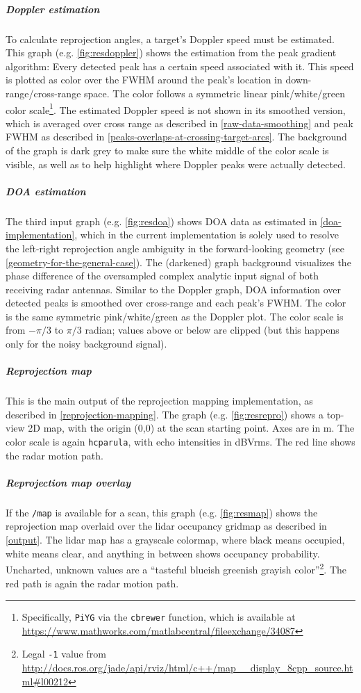 \subparagraph{Doppler estimation}
To calculate reprojection angles, a target's Doppler speed must be estimated. This graph (e.g. \cref{fig:resdoppler}) shows the estimation from the peak gradient algorithm: Every detected peak has a certain speed associated with it. This speed is plotted as color over the FWHM around the peak's location in down-range/cross-range space. The color follows a symmetric linear pink/white/green color scale\footnote{Specifically, \texttt{PiYG} via the \texttt{cbrewer} function, which is available at \url{https://www.mathworks.com/matlabcentral/fileexchange/34087}}. The estimated Doppler speed is not shown in its smoothed version, which is averaged over cross range as described in \cref{raw-data-smoothing} and peak FWHM as described in \cref{peaks-overlaps-at-crossing-target-arcs}. The background of the graph is dark grey to make sure the white middle of the color scale is visible, as well as to help highlight where Doppler peaks were actually detected.

\subparagraph{DOA estimation}
The third input graph (e.g. \cref{fig:resdoa}) shows DOA data as estimated in \cref{doa-implementation}, which in the current implementation is solely used to resolve the left-right reprojection angle ambiguity in the forward-looking geometry (see \cref{geometry-for-the-general-case}). The (darkened) graph background visualizes the phase difference of the oversampled complex analytic input signal of both receiving radar antennas. Similar to the Doppler graph, DOA information over detected peaks is smoothed over cross-range and each peak's FWHM. The color is the same symmetric pink/white/green as the Doppler plot. The color scale is from $-\pi/3$ to $\pi/3$ radian; values above or below are clipped (but this happens only for the noisy background signal).

\subparagraph{Reprojection map}
This is the main output of the reprojection mapping implementation, as described in \cref{reprojection-mapping}. The graph (e.g. \cref{fig:resrepro}) shows a top-view 2D map, with the origin (0,0) at the scan starting point. Axes are in \si{m}. The color scale is again \texttt{hcparula}, with echo intensities in \si{dBVrms}. The red line shows the radar motion path.

\subparagraph{Reprojection map overlay}
If the \texttt{/map} is available for a scan, this graph (e.g. \cref{fig:resmap}) shows the reprojection map overlaid over the lidar occupancy gridmap as described in \cref{output}. The lidar map has a grayscale colormap, where black means occupied, white means clear, and anything in between shows occupancy probability. Uncharted, unknown values are a ``tasteful blueish greenish grayish color''\footnote{Legal \texttt{-1} value from \url{http://docs.ros.org/jade/api/rviz/html/c++/map\_\_display\_8cpp\_source.html\#l00212}}. The red path is again the radar motion path.

